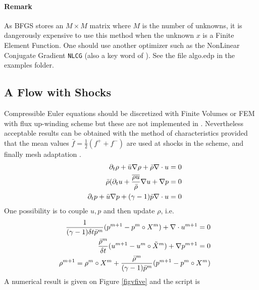 \documentclass[a4paper,twoside,12pt]{book}
\def\p{\partial}
\def\n{\nabla}
\begin{document}
\paragraph{Remark} As BFGS stores an $M\times M$ matrix where $M$ is the number of
unknowns, it is dangerously expensive to use this method when the unknown $x$ is a
Finite Element Function.  One should use another optimizer such as
the NonLinear Conjugate Gradient \texttt{NLCG} (also a key word
of \freefempp).  See the file algo.edp in the examples folder.

\subsection{A Flow with Shocks}
Compressible Euler  equations should be discretized with Finite Volumes or FEM with flux up-winding scheme but these are not implemented in \freefempp.  Nevertheless acceptable results can be obtained with the method of characteristics
provided that the mean values $\bar f=\frac12(f^++f^-)$ are used at shocks in the scheme, and finally  mesh adaptation .%
\begin{eqnarray}\label{euler}&&
    \p_t\rho+\bar u\n\rho + \bar\rho\n\cdot u=0
    \cr&&
   \bar\rho( \p_t u+\frac{\overline{\rho u}}{\bar\rho}\n u +\n p=0
    \cr&&
    \p_t p + \bar u\n p +(\gamma-1)\bar p\n\cdot u =0
\end{eqnarray}
%
One possibility is to couple $u,p$ and then update $\rho$, i.e.
%
\begin{eqnarray}\label{eulalgo}&&
    \frac 1{(\gamma-1)\delta t\bar p^m} (p^{m+1}-p^m \circ X^m) + \n\cdot u^{m+1} =0
    \cr&&
    \frac{\bar\rho^m}{\delta t}(u^{m+1}-u^m \circ {\tilde X}^m ) +\n p^{m+1}=0
    \cr&&
    \rho^{m+1} = \rho^m \circ X^m +
        \frac{\bar\rho^m}{(\gamma-1)\bar p^m}(p^{m+1}-p^m \circ X^m)
\end{eqnarray}
A numerical result is given on Figure \ref{figvfive} and the \freefempp script is
\end{document}
